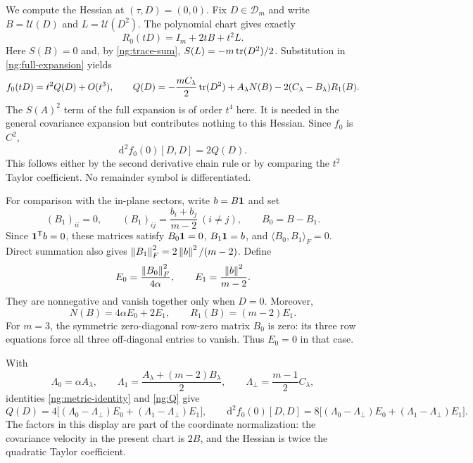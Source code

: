 We compute the Hessian at $(\tau,D)=(0,0)$.
Fix $D\in\mathcal D_m$ and write $B=\mathcal U(D)$ and
$L=\mathcal U(D^2)$. The polynomial chart gives exactly
\[
 R_0(tD)=I_m+2tB+t^2L.
\]
Here $S(B)=0$ and, by \eqref{ng:trace-sum},
$S(L)=-m\operatorname{tr}(D^2)/2$.
Substitution in \eqref{ng:full-expansion} yields
\begin{equation}\label{ng:Q}
 f_0(tD)=t^2 Q(D)+O(t^3),\qquad
 Q(D)=-\frac{mC_\lambda}{2}\operatorname{tr}(D^2)
      +A_\lambda N(B)-2(C_\lambda-B_\lambda)R_1(B).
\end{equation}
The $S(A)^2$ term of the full expansion is of order $t^4$ here.
It is needed in the general covariance expansion but contributes
nothing to this Hessian. Since $f_0$ is $C^2$,
\begin{equation}\label{ng:actual-hessian}
 \mathrm d^2 f_0(0)[D,D]=2Q(D).
\end{equation}
This follows either by the second derivative chain rule or by comparing
the $t^2$ Taylor coefficient. No remainder symbol is differentiated.

For comparison with the in-plane sectors, write $b=B\mathbf 1$ and set
\[
 (B_1)_{ii}=0,\qquad
 (B_1)_{ij}=\frac{b_i+b_j}{m-2}\ (i\ne j),\qquad B_0=B-B_1.
\]
Since $\mathbf 1^{\mathsf T}b=0$, these matrices satisfy
$B_0\mathbf 1=0$, $B_1\mathbf 1=b$, and $\langle B_0,B_1\rangle_F=0$.
Direct summation also gives
$\left\lVert B_1\right\rVert_F^2=2\left\lVert b\right\rVert^2/(m-2)$.
Define
\[
 E_0=\frac{\left\lVert B_0\right\rVert_F^2}{4\alpha},\qquad
 E_1=\frac{\left\lVert b\right\rVert^2}{m-2}.
\]
They are nonnegative and vanish together only when $D=0$. Moreover,
\[
 N(B)=4\alpha E_0+2E_1,\qquad R_1(B)=(m-2)E_1.
\]
For $m=3$, the symmetric zero-diagonal row-zero matrix $B_0$ is zero:
its three row equations force all three off-diagonal entries to vanish.
Thus $E_0=0$ in that case.

With
\[
 \Lambda_0=\alpha A_\lambda,\qquad
 \Lambda_1=\frac{A_\lambda+(m-2)B_\lambda}{2},\qquad
 \Lambda_\perp=\frac{m-1}{2}C_\lambda,
\]
identities \eqref{ng:metric-identity} and \eqref{ng:Q} give
\begin{equation}\label{ng:hessian-gaps}
 Q(D)=4\bigl[(\Lambda_0-\Lambda_\perp)E_0
               +(\Lambda_1-\Lambda_\perp)E_1\bigr],
 \qquad
 \mathrm d^2 f_0(0)[D,D]
   =8\bigl[(\Lambda_0-\Lambda_\perp)E_0
               +(\Lambda_1-\Lambda_\perp)E_1\bigr].
\end{equation}
The factors in this display are part of the coordinate normalization:
the covariance velocity in the present chart is $2B$, and the Hessian
is twice the quadratic Taylor coefficient.


